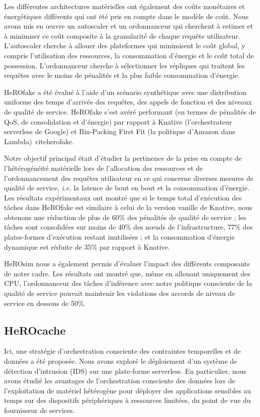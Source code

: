 Les différentes architectures matérielles ont également des coûts monétaires et énergétiques différents qui ont été pris en compte dans le modèle de coût. Nous avons mis en œuvre un autoscaler et un ordonnanceur qui cherchent à estimer et à minimiser ce coût composite à la granularité de chaque requête utilisateur. L'autoscaler cherche à allouer des plateformes qui minimisent le coût global, y compris l'utilisation des ressources, la consommation d'énergie et le coût total de possession. L'ordonnanceur cherche à sélectionner les répliques qui traitent les requêtes avec le moins de pénalités et la plus faible consommation d'énergie.

HeROfake a été évalué à l'aide d'un scénario synthétique avec une distribution uniforme des temps d'arrivée des requêtes, des appels de fonction et des niveaux de qualité de service. HeROfake s'est avéré performant (en termes de pénalités de QoS, de consolidation et d'énergie) par rapport à Knative (l'orchestrateur serverless de Google) et Bin-Packing First Fit (la politique d'Amazon dans Lambda)~cite{herofake}. 

Notre objectif principal était d'étudier la pertinence de la prise en compte de l'hétérogénéité matérielle lors de l'allocation des ressources et de l'ordonnancement des requêtes utilisateur en ce qui concerne diverses mesures de qualité de service, \textit{i.e.} la latence de bout en bout et la consommation d'énergie. Les résultats expérimentaux ont montré que si le temps total d'exécution des tâches dans HeROfake est similaire à celui de la version vanille de Knative, nous obtenons une réduction de plus de 60\% des pénalités de qualité de service ; les tâches sont consolidées sur moins de 40\% des nœuds de l'infrastructure, 77\% des plates-formes d'exécution restant inutilisées ; et la consommation d'énergie dynamique est réduite de 35\% par rapport à Knative.

HeROsim nous a également permis d'évaluer l'impact des différents composants de notre cadre. Les résultats ont montré que, même en allouant uniquement des CPU, l'ordonnanceur des tâches d'inférence avec notre politique consciente de la qualité de service pouvait maintenir les violations des accords de niveau de service en dessous de 50\%. 

\subsection{HeROcache}

Ici, une stratégie d'orchestration consciente des contraintes temporelles et de données a été proposée. Nous avons exploré le déploiement d'un système de détection d'intrusion (IDS) sur une plate-forme serverless. En particulier, nous avons étudié les avantages de l'orchestration consciente des données lors de l'exploitation de matériel hétérogène pour déployer des applications sensibles au temps sur des dispositifs périphériques à ressources limitées, du point de vue du fournisseur de services.

